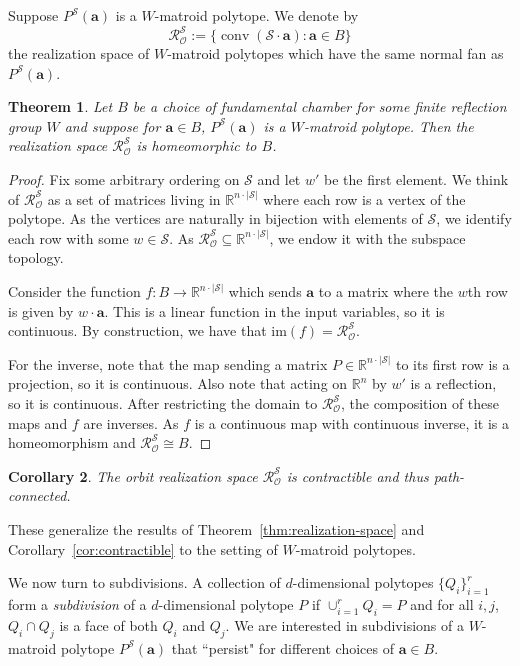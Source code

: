 \documentclass{amsart}
\newtheorem{thm}{Theorem}[section]
\newtheorem{corollary}[thm]{Corollary}
\theoremstyle{definition}
\newcommand{\ospace}{\mathcal{R}_{\mathcal{O}}}
\newcommand{\bR}{\mathbb{R}}
\def\ba{\mathbf{a}}
\def\cS{\mathcal{S}}
\DeclareMathOperator{\conv}{conv}
\begin{document}
Suppose $P^\cS(\ba)$ is a $W$-matroid polytope. 
We denote by
\[\ospace^\cS:= \{\conv(\cS\cdot\ba):\ba\in B\}\] the realization space of $W$-matroid polytopes which have the same normal fan as $P^\cS(\ba)$.

\begin{thm}\label{thm:gen_perm-orbit-realization-space}
    Let $B$ be a choice of fundamental chamber for some finite reflection group $W$ and suppose for $\ba \in B$, $P^{\cS}(\ba)$ is a $W$-matroid polytope. Then the realization space $\ospace^\cS$ is homeomorphic to $B$.
\end{thm}

\begin{proof}
    Fix some arbitrary ordering on $\cS$ and let $w'$ be the first element. We think of $\ospace^\cS$ as a set of matrices living in $\bR^{n\cdot |\cS|}$ where each row is a vertex of the polytope. As the vertices are naturally in bijection with elements of $\cS$, we identify each row with some $w\in \cS$. As $\ospace^\cS\subseteq \bR^{n\cdot |\cS|}$, we endow it with the subspace topology.
    
    Consider the function $f:B\rightarrow\bR^{n\cdot |\cS|}$ which sends $\ba$ to a matrix where the $w$th row is given by $w\cdot\ba$. This is a linear function in the input variables, so it is continuous. By construction, we have that $\mathrm{im}(f)=\ospace^\cS$.
    
    For the inverse, note that the map sending a matrix $P\in \bR^{n\cdot |\cS|}$ to its first row is a projection, so it is continuous. Also note that acting on $\bR^n$ by $w'$ is a reflection, so it is continuous. After restricting the domain to $\ospace^\cS$, the composition of these maps and $f$ are inverses. As $f$ is a continuous map with continuous inverse, it is a homeomorphism and $\ospace^\cS\cong B$.
    
\end{proof}


\begin{corollary}\label{cor:contractible-gen-perm}
   The orbit realization space $\ospace^\cS$ is contractible and thus path-connected.
\end{corollary}

These generalize the results of Theorem~\ref{thm:realization-space} and Corollary~\ref{cor:contractible} to the setting of $W$-matroid polytopes. 

We now turn to subdivisions. A collection of $d$-dimensional polytopes $\{Q_i\}_{i=1}^r$ form a \emph{subdivision} of a $d$-dimensional polytope $P$ if $\cup_{i=1}^r Q_i = P$ and for all $i,j$, $Q_i \cap Q_j$ is a face of both $Q_i$ and $Q_j$. We are interested in subdivisions of a $W$-matroid polytope $P^\cS(\ba)$ that ``persist" for different choices of $\ba\in B$.
\end{document}
